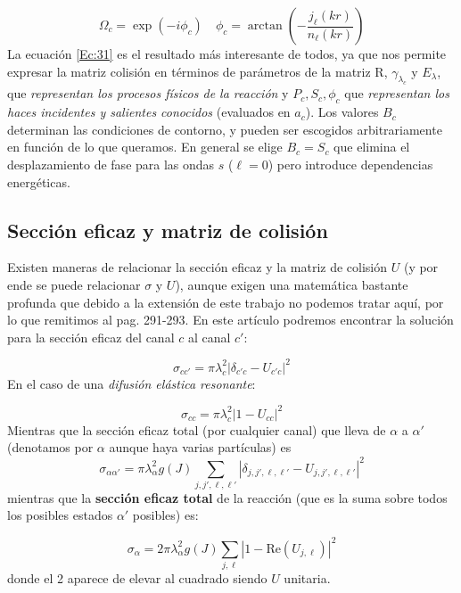 \documentclass[fleqn,10pt]{SelfArx} %
\newcommand{\parentesis}[1]{\left( #1  \right)}
\begin{document}
\begin{equation}
	\Omega_c = \exp (-i\phi_c) \quad \phi_c = \arctan \parentesis{-\frac{j_\ell (kr)}{n_\ell (kr)}}
\end{equation}
La ecuación \ref{Ec:31} es el resultado más interesante de todos, ya que nos permite expresar la matriz colisión en términos de parámetros de la matriz R, $\gamma_{\lambda_c}$ y $E_\lambda$, que \textit{representan los procesos físicos de la reacción} y $P_c,S_c,\phi_c$ que \textit{representan los haces incidentes y salientes conocidos} (evaluados en $a_c$). Los valores $B_c$ determinan las condiciones de contorno, y pueden ser escogidos arbitrariamente en función de lo que queramos. En general se elige $B_c=S_c$ que elimina el desplazamiento de fase para las ondas $s$ ($\ell=0$) pero introduce dependencias energéticas. 

\subsection{Sección eficaz y matriz de colisión}

Existen maneras de relacionar la sección eficaz y la matriz de colisión $U$ (y por ende se puede relacionar $\sigma$ y $U$), aunque exigen una matemática bastante profunda que debido a la extensión de este trabajo no podemos tratar aquí, por lo que remitimos al \cite{Biblia} pag. 291-293. En este artículo podremos encontrar la solución para la sección eficaz del canal $c$ al canal $c'$:

\begin{equation}
	\sigma_{cc'} = \pi \lambda^2_c |\delta_{c'c} - U_{c'c}|^2
\end{equation}
En el caso de una \textit{difusión elástica resonante}:

\begin{equation}
	\sigma_{cc} = \pi \lambda^2_c |1 - U_{cc}|^2
\end{equation}
Mientras que la sección eficaz total (por cualquier canal) que lleva de $\alpha$ a $\alpha'$ (denotamos por $\alpha$ aunque haya varias partículas) es
\begin{equation}
	\sigma_{\alpha \alpha'} = \pi \lambda^2_\alpha g(J) \sum_{j,j',\ell,\ell'}|\delta_{j,j',\ell,\ell'} - U_{j,j',\ell,\ell' } |^2
\end{equation}
mientras que la \textbf{sección eficaz total} de la reacción (que es la suma sobre todos los posibles estados $\alpha'$ posibles) es:

\begin{equation}
	\sigma_{\alpha} = 2\pi \lambda^2_\alpha g(J) \sum_{j,\ell}|1 - \text{Re} ( U_{j,\ell} )|^2
\end{equation}
donde el 2 aparece de elevar al cuadrado siendo $U$ unitaria.
\end{document}
